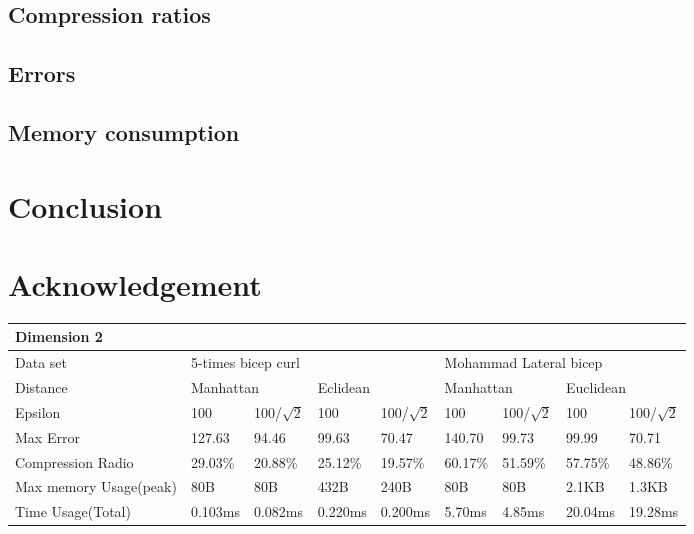 \documentclass[10pt, conference, compsocconf]{IEEEtran}
\begin{document}
\subsection{Compression ratios}

\subsection{Errors}

\subsection{Memory consumption}

\section{Conclusion}

\section*{Acknowledgement}
\begin{table*}[]
    \begin{tabular}{|l|l|l|l|l|l|l|l|l|}
    \hline
    \multicolumn{9}{|l|}{Dimension 2}                                                                                                                         \\ \hline
    Data set               & \multicolumn{4}{l|}{5-times bicep curl}                        & \multicolumn{4}{l|}{Mohammad Lateral bicep}                     \\ \hline
    Distance               & \multicolumn{2}{l|}{Manhattan} & \multicolumn{2}{l|}{Eclidean} & \multicolumn{2}{l|}{Manhattan} & \multicolumn{2}{l|}{Euclidean} \\ \hline
    Epsilon                & 100          & 100/$\sqrt{2}$  & 100         & 100/$\sqrt{2}$  & 100        & 100/$\sqrt{2}$    & 100        & 100/$\sqrt{2}$    \\ \hline
    Max Error              & 127.63       & 94.46           & 99.63       & 70.47           & 140.70     & 99.73             & 99.99      & 70.71             \\ \hline
    Compression Radio      & 29.03\%      & 20.88\%         & 25.12\%     & 19.57\%         & 60.17\%    & 51.59\%           & 57.75\%    & 48.86\%           \\ \hline
    Max memory Usage(peak) & 80B          & 80B             & 432B        & 240B            & 80B        & 80B               & 2.1KB      & 1.3KB             \\ \hline
    Time Usage(Total)      & 0.103ms      & 0.082ms         & 0.220ms     & 0.200ms         & 5.70ms     & 4.85ms            & 20.04ms    & 19.28ms           \\ \hline
    \end{tabular}
\end{table*}
\end{document}
